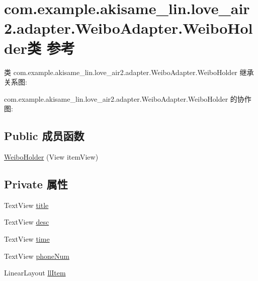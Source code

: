 \hypertarget{classcom_1_1example_1_1akisame__lin_1_1love__air2_1_1adapter_1_1_weibo_adapter_1_1_weibo_holder}{}\section{com.\+example.\+akisame\+\_\+lin.\+love\+\_\+air2.\+adapter.\+Weibo\+Adapter.\+Weibo\+Holder类 参考}
\label{classcom_1_1example_1_1akisame__lin_1_1love__air2_1_1adapter_1_1_weibo_adapter_1_1_weibo_holder}


类 com.\+example.\+akisame\+\_\+lin.\+love\+\_\+air2.\+adapter.\+Weibo\+Adapter.\+Weibo\+Holder 继承关系图\+:


com.\+example.\+akisame\+\_\+lin.\+love\+\_\+air2.\+adapter.\+Weibo\+Adapter.\+Weibo\+Holder 的协作图\+:
\subsection*{Public 成员函数}
\begin{DoxyCompactItemize}
\item 
\mbox{\hyperlink{classcom_1_1example_1_1akisame__lin_1_1love__air2_1_1adapter_1_1_weibo_adapter_1_1_weibo_holder_a49dea40cd5ada31f57e9293f7c7d271e}{Weibo\+Holder}} (View item\+View)
\end{DoxyCompactItemize}
\subsection*{Private 属性}
\begin{DoxyCompactItemize}
\item 
Text\+View \mbox{\hyperlink{classcom_1_1example_1_1akisame__lin_1_1love__air2_1_1adapter_1_1_weibo_adapter_1_1_weibo_holder_a0dd9247d30f6523f3b4d839fcb0aa736}{title}}
\item 
Text\+View \mbox{\hyperlink{classcom_1_1example_1_1akisame__lin_1_1love__air2_1_1adapter_1_1_weibo_adapter_1_1_weibo_holder_a611fa907bd2a9b17ac9095b578c2689a}{desc}}
\item 
Text\+View \mbox{\hyperlink{classcom_1_1example_1_1akisame__lin_1_1love__air2_1_1adapter_1_1_weibo_adapter_1_1_weibo_holder_a342ffd808d0a94495ab2de9065d198bb}{time}}
\item 
Text\+View \mbox{\hyperlink{classcom_1_1example_1_1akisame__lin_1_1love__air2_1_1adapter_1_1_weibo_adapter_1_1_weibo_holder_a863ad180da331a771f538e0a84d8db10}{phone\+Num}}
\item 
Linear\+Layout \mbox{\hyperlink{classcom_1_1example_1_1akisame__lin_1_1love__air2_1_1adapter_1_1_weibo_adapter_1_1_weibo_holder_a10414043f5fd78fef49950401356f263}{ll\+Item}}
\end{DoxyCompactItemize}


